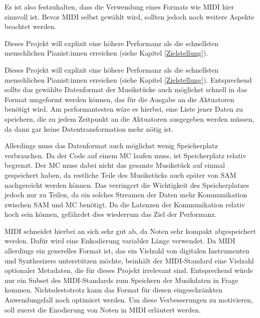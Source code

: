 Es ist also festzuhalten, dass die Verwendung eines Formats wie \ac{MIDI} hier sinnvoll ist.
Bevor \ac{MIDI} selbst gewählt wird, sollten jedoch noch weitere Aspekte beachtet werden.

Dieses Projekt will explizit eine höhere Performanz als die schnellsten menschlichen Pianist:innen erreichen (siehe Kapitel \ref*{Zielstellung}). %

Dieses Projekt will explizit eine höhere Performanz als die schnellsten menschlichen Pianist:innen erreichen (siehe Kapitel \ref*{Zielstellung}).
Entsprechend sollte das gewählte Datenformat der Musikstücke auch möglichst schnell in das Format umgeformt werden können, das für die Ausgabe an die Aktuatoren benötigt wird.
Am performantesten wäre es hierbei, eine Liste jener Daten zu speichern, die zu jedem Zeitpunkt an die Aktuatoren ausgegeben werden müssen, da dann gar keine Datentransformation mehr nötig ist.

Allerdings muss das Datenformat auch möglichst wenig Speicherplatz verbrauchen.
Da der Code auf einem \ac{MC} laufen muss, ist Speicherplatz relativ begrenzt.
Der \ac{MC} muss dabei nicht das gesamte Musikstück auf einmal gespeichert haben, da restliche Teile des Musikstücks auch später von \ac{SAM} nachgereicht werden können.
Das verringert die Wichtigkeit des Speicherplatzes jedoch nur zu Teilen, da ein solches Streamen der Daten mehr Kommunikation zwischen \ac{SAM} und {MC} benötigt.
Da die Latenzen der Kommunikation relativ hoch sein können, gefährdet dies wiederrum das Ziel der Performanz.

\ac{MIDI} schneidet hierbei an sich sehr gut ab, da Noten sehr kompakt abgespeichert werden.
Dafür wird eine Enkodierung variabler Länge verwendet.
Da \ac{MIDI} allerdings ein generelles Format ist, das ein Vielzahl von digitalen Instrumenten und Synthesizers unterstützen möchte, beinhält der \ac{MIDI}-Standard eine Vielzahl optionaler Metadaten, die für dieses Projekt irrelevant sind.
Entsprechend würde nur ein Subset des \ac{MIDI}-Standards zum Speichern der Musikdaten in Frage kommen.
Nichtsdestotrotz kann das Format für diesen eingeschränkten Anwendungsfall noch optimiert werden.
Um diese Verbesserungen zu motivieren, soll zuerst die Enodierung von Noten in \ac{MIDI} erläutert werden.

